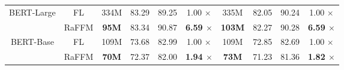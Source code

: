 \begin{table}
{\begin{tabular}{cccccccccc}
\multirow{4}{*}{BERT-Large}     & \multirow{2}{*}{FL}              & \multirow{2}{*}{334M}             & \multirow{2}{*}{83.29}                 & \multirow{2}{*}{89.25}       & \multirow{2}{*}{1.00 $\times$}     & \multirow{2}{*}{335M}             & \multirow{2}{*}{82.05}                 & \multirow{2}{*}{90.24}       & \multirow{2}{*}{1.00 $\times$}     \\
                                &                                  &                                   &                                        &                              &                                    &                                   &                                        &                              &                                    \\
                                & \multirow{2}{*}{RaFFM}           & \multirow{2}{*}{\textbf{95M}}              & \multirow{2}{*}{83.34}                 & \multirow{2}{*}{90.87}       & \multirow{2}{*}{\textbf{6.59 $\times$}}     & \multirow{2}{*}{\textbf{103M}}             & \multirow{2}{*}{82.27}                 & \multirow{2}{*}{90.28}       & \multirow{2}{*}{\textbf{6.59 $\times$}}     \\
                                &                                  &                                   &                                        &                              &                                    &                                   &                                        &                              &                                    \\ \hline
\multirow{4}{*}{BERT-Base}      & \multirow{2}{*}{FL}              & \multirow{2}{*}{109M}             & \multirow{2}{*}{73.68}                 & \multirow{2}{*}{82.99}       & \multirow{2}{*}{1.00 $\times$}     & \multirow{2}{*}{109M}             & \multirow{2}{*}{72.85}                 & \multirow{2}{*}{82.69}       & \multirow{2}{*}{1.00 $\times$}     \\
                                &                                  &                                   &                                        &                              &                                    &                                   &                                        &                              &                                    \\
                                & \multirow{2}{*}{RaFFM}           & \multirow{2}{*}{\textbf{70M}}              & \multirow{2}{*}{72.37}                 & \multirow{2}{*}{82.00}       & \multirow{2}{*}{\textbf{1.94 $\times$}}     & \multirow{2}{*}{\textbf{73M}}              & \multirow{2}{*}{71.23}                 & \multirow{2}{*}{81.36}       & \multirow{2}{*}{\textbf{1.82 $\times$}}     \\

\end{tabular}}
\end{table}
